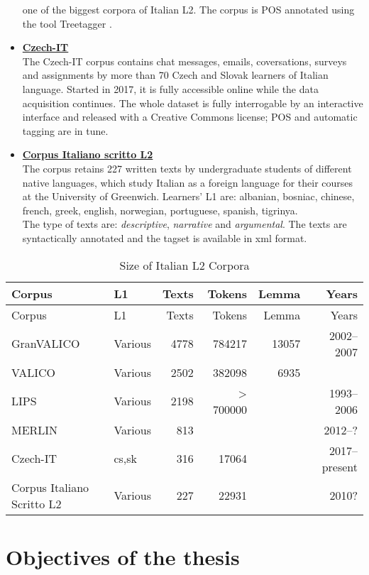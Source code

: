 \documentclass[a4paper,twoside,12pt,chapterprefix=false,bibliography=totocnumbered,listof=flat]{scrbook}
\theoremstyle{definition}
\theoremstyle{definition}
\theoremstyle{definition}
\theoremstyle{remark}
\begin{document}
\begin{itemize}
  one of the biggest corpora of Italian L2. The corpus is POS annotated
  using the tool Treetagger \citep{schmid1994}.
\item
  \textbf{\href{http://czech-it.github.io}{Czech-IT}} \citep{czech-it}\\
  The Czech-IT corpus contains chat messages, emails, coversations,
  surveys and assignments by more than 70 Czech and Slovak learners of
  Italian language. Started in 2017, it is fully accessible online while
  the data acquisition continues. The whole dataset is fully
  interrogable by an interactive interface and released with a Creative
  Commons license; POS and automatic tagging are in tune.
\item
  \textbf{\href{http://www.parlaritaliano.it/index.php/it/corpora-di-parlato/662-corpus-italiano-scritto-l2}{Corpus
  Italiano scritto L2}} \citep{vogheraturco2010}\\
  The corpus retains 227 written texts by undergraduate students of
  different native languages, which study Italian as a foreign language
  for their courses at the University of Greenwich. Learners' L1 are:
  albanian, bosniac, chinese, french, greek, english, norwegian,
  portuguese, spanish, tigrinya.\\
  The type of texts are: \emph{descriptive}, \emph{narrative} and
  \emph{argumental}. The texts are syntactically annotated and the
  tagset is available in xml format.
\end{itemize}

\begin{longtable}[]{@{}llrrrr@{}}
\caption{Size of Italian L2 Corpora}\tabularnewline
\toprule
Corpus & L1 & Texts & Tokens & Lemma & Years\tabularnewline
\midrule
\endfirsthead
\toprule
Corpus & L1 & Texts & Tokens & Lemma & Years\tabularnewline
\midrule
\endhead
GranVALICO & Various & 4778 & 784217 & 13057 & 2002--2007\tabularnewline
VALICO & Various & 2502 & 382098 & 6935 &\tabularnewline
LIPS & Various & 2198 & \textgreater{} 700000 & &
1993--2006\tabularnewline
MERLIN & Various & 813 & & & 2012--?\tabularnewline
Czech-IT & cs,sk & 316 & 17064 & & 2017--present\tabularnewline
Corpus Italiano Scritto L2 & Various & 227 & 22931 & &
2010?\tabularnewline
\bottomrule
\end{longtable}

\section{Objectives of the thesis}\label{objectives-of-the-thesis}
\end{document}

